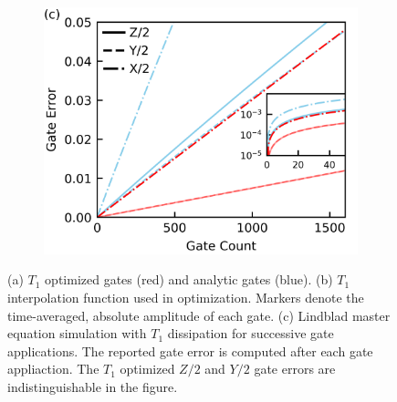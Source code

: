\documentclass[
  amsfonts,
  amsmath,
  tbtags,
  amssymb,
  aps,
  nobibnotes,
  twocolumn,
  superscriptaddress,
]{revtex4-2}
\begin{document}
\begin{figure}[ht]
\begin{subfigure}{.23\textwidth}
  \end{subfigure}\hfill
  \begin{subfigure}{.4\textwidth}
    \includegraphics[width=\linewidth]{assets/f1c.png}
  \end{subfigure}
  \caption{
    (a) $T_{1}$ optimized gates (red) and analytic gates (blue).
    (b) $T_{1}$ interpolation function used in optimization. Markers
    denote the time-averaged, absolute amplitude of each gate.
    (c) Lindblad master equation simulation with $T_{1}$ dissipation
    for successive gate applications. The reported gate error is computed after
    each gate appliaction. The $T_{1}$ optimized $Z/2$ and $Y/2$ gate errors are indistinguishable
    in the figure.
  }
\end{figure}

\end{document}
